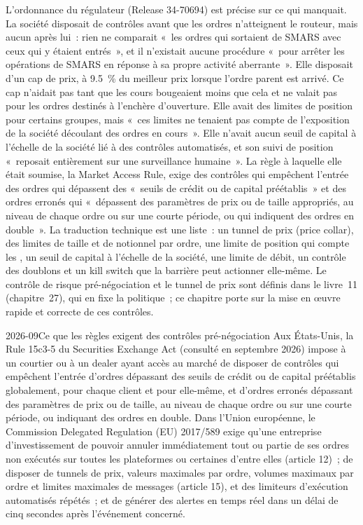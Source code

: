 L'ordonnance du régulateur (Release 34-70694) est précise sur ce qui manquait. La société disposait de contrôles avant que les ordres n'atteignent le
routeur, mais aucun après lui~: rien ne comparait «~les ordres qui sortaient de SMARS avec ceux qui y étaient entrés~», et il n'existait aucune procédure
«~pour arrêter les opérations de SMARS en réponse à sa propre activité aberrante~». Elle disposait d'un cap de prix, à 9.5~\% du meilleur prix lorsque l'ordre parent
est arrivé. Ce cap n'aidait pas tant que les cours bougeaient moins que cela et ne valait pas pour les ordres destinés à l'enchère
d'ouverture. Elle avait des limites de position pour certains groupes, mais «~ces limites ne tenaient pas compte de l'exposition de la société découlant
des ordres en cours~». Elle n'avait aucun seuil de capital à l'échelle de la société lié à des contrôles automatisés, et son suivi de position «~reposait entièrement sur
une surveillance humaine~». La règle à laquelle elle était soumise, la Market Access Rule, exige des contrôles qui empêchent l'entrée des ordres
qui dépassent des «~seuils de crédit ou de capital préétablis~» et des ordres erronés qui «~dépassent des paramètres de prix ou de taille
appropriés, au niveau de chaque ordre ou sur une courte période, ou qui indiquent des ordres en double~». La traduction technique
est une liste~: un tunnel de prix (price collar), des limites de taille et de notionnel par ordre, une limite de position qui compte les , un
seuil de capital à l'échelle de la société, une limite de débit, un contrôle des doublons et un kill switch que la barrière peut actionner elle-même. Le contrôle
de risque pré-négociation et le tunnel de prix sont définis dans le livre~11 (chapitre~27), qui en fixe la politique~; ce chapitre porte sur
la mise en œuvre rapide et correcte de ces contrôles.

\begin{dated}{2026-09}{Ce que les règles exigent des contrôles pré-négociation}\label{dat:ll:pre-trade-risk-and-kill-switches:rules}
Aux États-Unis, la Rule 15c3-5 du Securities Exchange Act (consulté en septembre 2026) impose à un courtier ou à un dealer ayant
accès au marché de disposer de contrôles qui empêchent l'entrée d'ordres dépassant des seuils de crédit ou de capital préétablis globalement,
pour chaque client et pour elle-même, et d'ordres erronés dépassant des paramètres de prix ou de taille, au niveau de chaque ordre ou sur une courte
période, ou indiquant des ordres en double. Dans l'Union européenne, le Commission Delegated Regulation (EU) 2017/589 exige qu'une
entreprise d'investissement de pouvoir annuler immédiatement tout ou partie de ses ordres non exécutés sur toutes les plateformes ou certaines d'entre elles (article 12)~; de disposer de
tunnels de prix, valeurs maximales par ordre, volumes maximaux par ordre et limites maximales de messages (article 15), et des
limiteurs d'exécution automatisés répétés~; et de générer des alertes en temps réel dans un délai de cinq secondes après l'événement concerné.
\end{dated}

